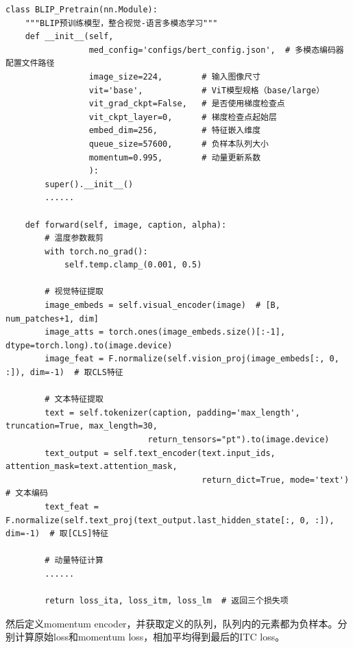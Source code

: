 \documentclass[zihao=false,fontset=windows]{ctexart}
\begin{document}
\begin{feishucode}
\begin{lstlisting}
class BLIP_Pretrain(nn.Module):
    """BLIP预训练模型，整合视觉-语言多模态学习"""
    def __init__(self,                 
                 med_config='configs/bert_config.json',  # 多模态编码器配置文件路径
                 image_size=224,        # 输入图像尺寸
                 vit='base',            # ViT模型规格（base/large）
                 vit_grad_ckpt=False,   # 是否使用梯度检查点
                 vit_ckpt_layer=0,      # 梯度检查点起始层
                 embed_dim=256,         # 特征嵌入维度
                 queue_size=57600,      # 负样本队列大小
                 momentum=0.995,        # 动量更新系数
                 ):
        super().__init__()
        ......
        
    def forward(self, image, caption, alpha):
        # 温度参数裁剪
        with torch.no_grad():
            self.temp.clamp_(0.001, 0.5)
        
        # 视觉特征提取
        image_embeds = self.visual_encoder(image)  # [B, num_patches+1, dim]
        image_atts = torch.ones(image_embeds.size()[:-1], dtype=torch.long).to(image.device)
        image_feat = F.normalize(self.vision_proj(image_embeds[:, 0, :]), dim=-1)  # 取CLS特征
        
        # 文本特征提取
        text = self.tokenizer(caption, padding='max_length', truncation=True, max_length=30, 
                             return_tensors="pt").to(image.device)
        text_output = self.text_encoder(text.input_ids, attention_mask=text.attention_mask,
                                        return_dict=True, mode='text')  # 文本编码
        text_feat = F.normalize(self.text_proj(text_output.last_hidden_state[:, 0, :]), dim=-1)  # 取[CLS]特征

        # 动量特征计算
        ......
        
        return loss_ita, loss_itm, loss_lm  # 返回三个损失项
\end{lstlisting}
\end{feishucode}
然后定义momentum encoder，并获取定义的队列，队列内的元素都为负样本。分别计算原始loss和momentum loss，相加平均得到最后的ITC loss。\par
\end{document}

